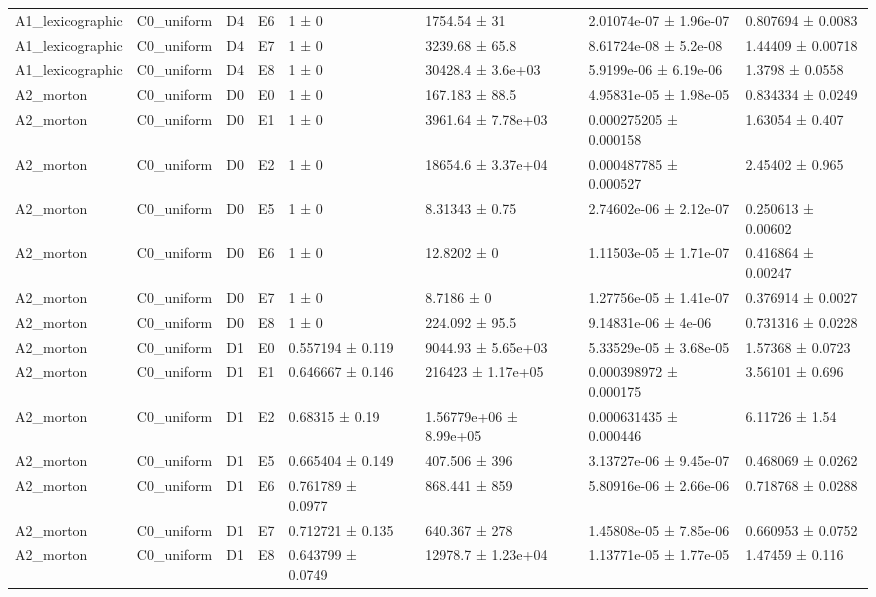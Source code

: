 \begin{table}
\begin{tabular}{lllllllll}
A1\_lexicographic & C0\_uniform & D4 & E6 & 1 ± 0 &  & 1754.54 ± 31 & 2.01074e-07 ± 1.96e-07 & 0.807694 ± 0.0083 \\
A1\_lexicographic & C0\_uniform & D4 & E7 & 1 ± 0 &  & 3239.68 ± 65.8 & 8.61724e-08 ± 5.2e-08 & 1.44409 ± 0.00718 \\
A1\_lexicographic & C0\_uniform & D4 & E8 & 1 ± 0 &  & 30428.4 ± 3.6e+03 & 5.9199e-06 ± 6.19e-06 & 1.3798 ± 0.0558 \\
A2\_morton & C0\_uniform & D0 & E0 & 1 ± 0 &  & 167.183 ± 88.5 & 4.95831e-05 ± 1.98e-05 & 0.834334 ± 0.0249 \\
A2\_morton & C0\_uniform & D0 & E1 & 1 ± 0 &  & 3961.64 ± 7.78e+03 & 0.000275205 ± 0.000158 & 1.63054 ± 0.407 \\
A2\_morton & C0\_uniform & D0 & E2 & 1 ± 0 &  & 18654.6 ± 3.37e+04 & 0.000487785 ± 0.000527 & 2.45402 ± 0.965 \\
A2\_morton & C0\_uniform & D0 & E5 & 1 ± 0 &  & 8.31343 ± 0.75 & 2.74602e-06 ± 2.12e-07 & 0.250613 ± 0.00602 \\
A2\_morton & C0\_uniform & D0 & E6 & 1 ± 0 &  & 12.8202 ± 0 & 1.11503e-05 ± 1.71e-07 & 0.416864 ± 0.00247 \\
A2\_morton & C0\_uniform & D0 & E7 & 1 ± 0 &  & 8.7186 ± 0 & 1.27756e-05 ± 1.41e-07 & 0.376914 ± 0.0027 \\
A2\_morton & C0\_uniform & D0 & E8 & 1 ± 0 &  & 224.092 ± 95.5 & 9.14831e-06 ± 4e-06 & 0.731316 ± 0.0228 \\
A2\_morton & C0\_uniform & D1 & E0 & 0.557194 ± 0.119 &  & 9044.93 ± 5.65e+03 & 5.33529e-05 ± 3.68e-05 & 1.57368 ± 0.0723 \\
A2\_morton & C0\_uniform & D1 & E1 & 0.646667 ± 0.146 &  & 216423 ± 1.17e+05 & 0.000398972 ± 0.000175 & 3.56101 ± 0.696 \\
A2\_morton & C0\_uniform & D1 & E2 & 0.68315 ± 0.19 &  & 1.56779e+06 ± 8.99e+05 & 0.000631435 ± 0.000446 & 6.11726 ± 1.54 \\
A2\_morton & C0\_uniform & D1 & E5 & 0.665404 ± 0.149 &  & 407.506 ± 396 & 3.13727e-06 ± 9.45e-07 & 0.468069 ± 0.0262 \\
A2\_morton & C0\_uniform & D1 & E6 & 0.761789 ± 0.0977 &  & 868.441 ± 859 & 5.80916e-06 ± 2.66e-06 & 0.718768 ± 0.0288 \\
A2\_morton & C0\_uniform & D1 & E7 & 0.712721 ± 0.135 &  & 640.367 ± 278 & 1.45808e-05 ± 7.85e-06 & 0.660953 ± 0.0752 \\
A2\_morton & C0\_uniform & D1 & E8 & 0.643799 ± 0.0749 &  & 12978.7 ± 1.23e+04 & 1.13771e-05 ± 1.77e-05 & 1.47459 ± 0.116 \\

\end{tabular}
\end{table}
